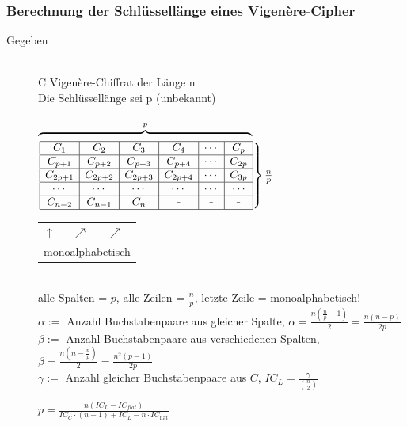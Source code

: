 \documentclass[10pt]{article}
\newcommand{\Bold}[1]{\textbf{#1}} %
\newcommand{\T}[1]{\text{#1}} %
\newcommand{\Brackar}[2]{\left.\begin{array}{#1} #2 \end{array}\right\rbrace} %
\begin{document}
\subsubsection{Berechnung der Schlüssellänge eines Vigen\`{e}re-Cipher}
\begin{description}
	\item[Gegeben] \hfill \\
		C Vigenère-Chiffrat der Länge n \\
		Die Schlüssellänge sei p (unbekannt) \\ \\
$\overbrace{\hspace{6.8cm}}^p$\\
$\Brackar{|c|c|c|c|c|c|}{ \hline
 C_1&C_2&C_3&C_4&\cdots&C_p\\\hline
 C_{p+1}&C_{p+2}&C_{p+3}&C_{p+4}&\cdots&C_{2p}\\\hline
 C_{2p+1}&C_{2p+2}&C_{2p+3}&C_{2p+4}&\cdots&C_{3p}\\\hline
 \cdots&\cdots&\cdots&\cdots&\cdots&\cdots\\\hline
 C_{n-2}&C_{n-1}&C_n&\Bold{-}&\Bold{-}&\Bold{-}\\\hline
}\frac{n}{p}$\\
\begin{tabular}{lll}
 $\uparrow$&\hspace{0.5cm}$\nearrow$&\hspace{0.7cm}$\nearrow$\\
 \multicolumn{3}{l}{monoalphabetisch}
\end{tabular}
\\
alle Spalten = $p$, alle Zeilen = $\frac{n}{p}$, letzte Zeile = monoalphabetisch!\\
$\alpha:=$ Anzahl Buchstabenpaare aus gleicher Spalte, $\alpha=\frac{n(\frac{n}{p}-1)}{2}=\frac{n(n-p)}{2p}$\\
$\beta:=$ Anzahl Buchstabenpaare aus verschiedenen Spalten, $\beta=\frac{n(n-\frac{n}{p})}{2}=\frac{n^2(p-1)}{2p}$\\
$\gamma:=$ Anzahl gleicher Buchstabenpaare aus $C$, $IC_L=\frac{\gamma}{{n\choose2}}$\\
\begin{center}
 \fbox{$\gamma=\alpha\cdot IC_L+\beta\cdot IC_{\T{flat}}$}
\end{center}
\begin{center}
 $p=\frac{n(IC_L-IC_{flat})}{IC_C\cdot(n-1)+IC_L-n\cdot IC_{\T{flat}}}$
\end{center}
\end{description}
\end{document}
